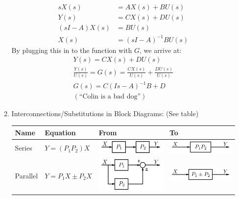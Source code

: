 \begin{enumerate}
\begin{enumerate}
                \begin{align*}
                    sX(s) &= AX(s) + BU(s) \\
                    Y(s) &= CX(s) + DU(s) \\
                    (sI - A)X(s) &= BU(s) \\
                    X(s) &= (sI - A)^{-1} BU(s)
                \end{align*}
                By plugging this in to the function with $G$, we arrive at:
                \begin{align*}
                    Y(s) = CX(s) + DU(s) \\
                    \frac{Y(s)}{U(s)} = G(s) = \frac{CX(s)}{U(s)} + \frac{DU(s)}{U(s)} \\
                    G(s) = C(Is - A)^{-1} B + D \\
                    (\text{``Colin is a bad dog''})
                \end{align*}

            \item Interconnections/Substitutions in Block Diagrams: (See table)

                \begin{table}[h]
                    \centering
                    \begin{tabular}{ | l || l | l | l |}
                        \hline
                        Name & Equation & From & To \\ \hline

                        Series &
                            $Y = (P_1P_2)X$ &
                            \includegraphics[width=40mm]{images/240px-Cascaded_Blocks.png} &
                            \includegraphics[width=40mm]{images/240px-Cascaded_Blocks_Equivalent.png} \\ \hline

                        Parallel &
                            $Y = P_1X \pm P_2X$ &
                            \includegraphics[width=40mm]{images/240px-Parallel_Blocks.png} &
                            \includegraphics[width=40mm]{images/240px-Parallel_Blocks_Equivalent_1.png} \\ \hline


\end{tabular}
\end{table}
\end{enumerate}
\end{enumerate}
